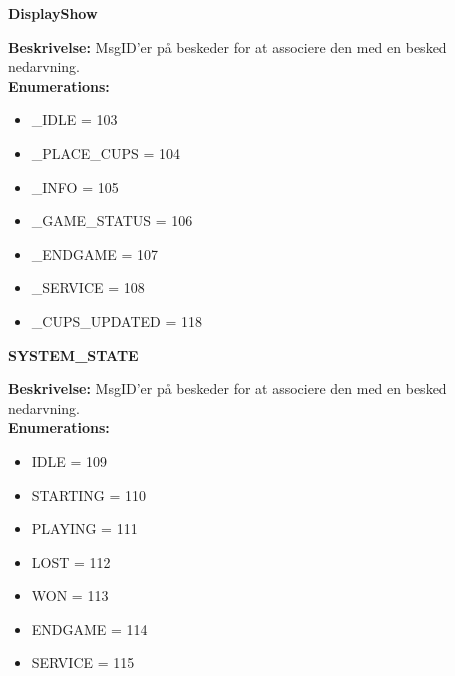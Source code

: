 \documentclass[Softwaredesign/Softwaredesign_main.tex]{subfiles}
\begin{document}
\textbf{DisplayShow}
\begin{adjustwidth}{1cm}{0pt}
\textbf{Beskrivelse:} MsgID'er på beskeder for at associere den med en besked nedarvning. \\[0.2cm]
\textbf{Enumerations:}
\begin{itemize}
    \item \_IDLE = 103
    \item \_PLACE\_CUPS = 104
    \item \_INFO = 105
    \item \_GAME\_STATUS = 106
	\item \_ENDGAME = 107
	\item \_SERVICE = 108
	\item \_CUPS\_UPDATED = 118
\end{itemize}
\end{adjustwidth}

\textbf{SYSTEM\_STATE}
\begin{adjustwidth}{1cm}{0pt}
\textbf{Beskrivelse:} MsgID'er på beskeder for at associere den med en besked nedarvning. \\[0.2cm]
\textbf{Enumerations:}
\begin{itemize}
    \item IDLE = 109
	\item STARTING = 110
	\item PLAYING = 111
	\item LOST = 112
	\item WON = 113
	\item ENDGAME = 114
	\item SERVICE = 115
\end{itemize}
\end{adjustwidth}
\end{document}
